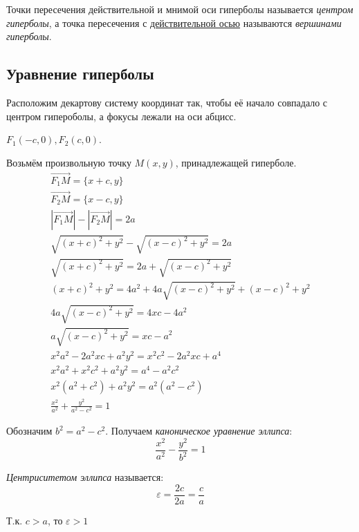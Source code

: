 Точки пересечения действительной и мнимой оси гиперболы называется \textit{центром гиперболы}, а точка пересечения с \underline{действительной осью} называются \textit{вершинами гиперболы}.

\subsection*{Уравнение гиперболы}

Расположим декартову систему координат так, чтобы её начало совпадало с центром гипероболы, а фокусы лежали на оси абцисс.

$F_1(-c, 0), F_2(c, 0)$.

Возьмём произвольную точку $M(x, y)$, принадлежащей гиперболе.
\begin{gather*}
  \overrightarrow{F_1M} = \{x + c, y\} \\
  \overrightarrow{F_2M} = \{x - c, y\} \\
  |\overrightarrow{F_1M}| - |\overrightarrow{F_2M}| = 2a \\
  \sqrt{(x + c)^2 + y^2} - \sqrt{(x - c)^2 + y^2} = 2a \\
  \sqrt{(x + c)^2 + y^2} = 2a + \sqrt{(x - c)^2 + y^2} \\
  (x + c)^2 + y^2 = 4a^2 + 4a\sqrt{(x - c)^2 + y^2} + (x - c)^2 + y^2 \\
  4a\sqrt{(x - c)^2 + y^2} = 4xc - 4a^2 \\
  a\sqrt{(x - c)^2 + y^2} = xc - a^2 \\
  x^2 a^2 - 2a^2xc + a^2y^2 = x^2c^2 - 2a^2xc + a^4 \\
  x^2a^2 + x^2c^2 + a^2y^2 = a^4 - a^2c^2 \\
  x^2(a^2 + c^2) + a^2y^2 = a^2(a^2 - c^2) \\
  \frac{x^2}{a^2} + \frac{y^2}{a^2 - c^2} = 1
\end{gather*}

Обозначим $b^2 = a^2 - c^2$. Получаем \textit{каноническое уравнение эллипса}: \[
  \boxed{\frac{x^2}{a^2} - \frac{y^2}{b^2} = 1}
\]  

\textit{Центриситетом эллипса} называется: \[
\varepsilon = \frac{2c}{2a} = \frac{c}{a}
\] 
\begin{note}
  Т.к. $c > a$, то  $\varepsilon > 1$
\end{note}

